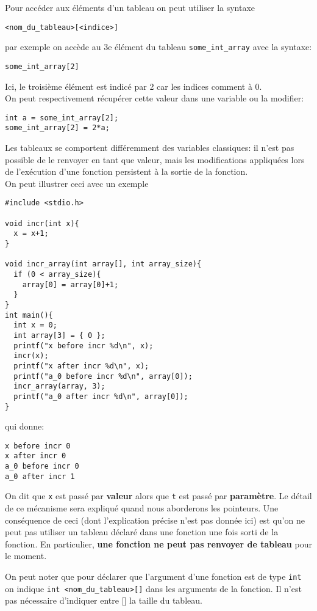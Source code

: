 \documentclass[11pt]{article}
\begin{document}
Pour accéder aux éléments d'un tableau on peut utiliser la syntaxe
\begin{verbatim}
<nom_du_tableau>[<indice>]
\end{verbatim}
par exemple on accède au 3e élément du tableau \texttt{some\_int\_array} avec la syntaxe:
\begin{verbatim}
some_int_array[2]
\end{verbatim}
Ici, le troisième élément est indicé par 2 car les indices comment à 0.\\

On peut respectivement récupérer cette valeur dans une variable ou la modifier:
\begin{verbatim}
int a = some_int_array[2];
some_int_array[2] = 2*a;
\end{verbatim}

Les tableaux se comportent différemment des variables classiques: il n'est pas possible de le renvoyer en tant que valeur, mais les modifications appliquées lors de l'exécution d'une fonction persistent à la sortie de la fonction.\\

On peut illustrer ceci avec un exemple
\begin{verbatim}
#include <stdio.h>

void incr(int x){
  x = x+1;
}

void incr_array(int array[], int array_size){
  if (0 < array_size){
    array[0] = array[0]+1;
  }
}
int main(){
  int x = 0;
  int array[3] = { 0 };
  printf("x before incr %d\n", x);
  incr(x);
  printf("x after incr %d\n", x);
  printf("a_0 before incr %d\n", array[0]);
  incr_array(array, 3);
  printf("a_0 after incr %d\n", array[0]);
}
\end{verbatim}

qui donne:
\begin{verbatim}
x before incr 0
x after incr 0
a_0 before incr 0
a_0 after incr 1
\end{verbatim}


On dit que \texttt{x} est passé par \textbf{valeur} alors que \texttt{t} est passé par \textbf{paramètre}. Le détail de ce mécanisme sera expliqué quand nous aborderons les pointeurs. Une conséquence de ceci (dont l'explication précise n'est pas donnée ici) est qu'on ne peut pas utiliser un tableau déclaré dans une fonction une fois sorti de la fonction. En particulier, \textbf{une fonction ne peut pas renvoyer de tableau} pour le moment.

On peut noter que pour déclarer que l'argument d'une fonction est de type \texttt{int} on indique \texttt{int <nom\_du\_tableau>[]} dans les arguments de la fonction. Il n'est pas nécessaire d'indiquer entre [] la taille du tableau.
\end{document}
